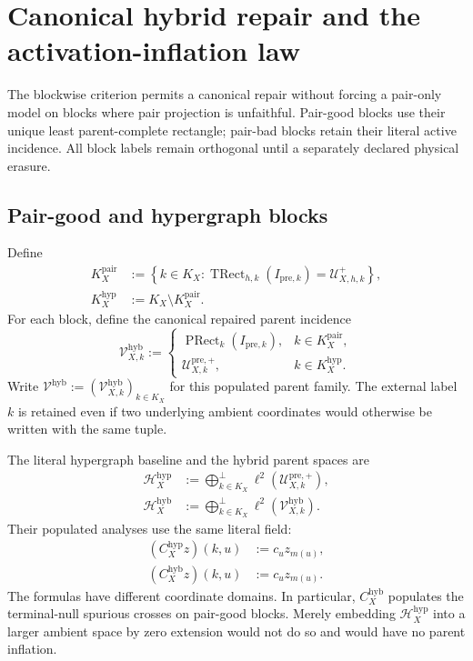 \section{Canonical hybrid repair and the activation-inflation law}
\label{sec:tpc64-hybrid-repair}

The blockwise criterion permits a canonical repair without forcing a
pair-only model on blocks where pair projection is unfaithful.  Pair-good
blocks use their unique least parent-complete rectangle; pair-bad blocks
retain their literal active incidence.  All block labels remain orthogonal
until a separately declared physical erasure.

\subsection{Pair-good and hypergraph blocks}

Define
\begin{align}
 K_X^{\mathrm{pair}}
 &:=
 \left\{k\in K_X:
 \operatorname{TRect}_{h,k}(I_{\mathrm{pre},k})
 =\mathcal U_{X,h,k}^{+}\right\},
 \label{eq:tpc64-pair-good-blocks}\\
 K_X^{\mathrm{hyp}}
 &:=
 K_X\setminus K_X^{\mathrm{pair}}.
 \label{eq:tpc64-hypergraph-blocks}
\end{align}
For each block, define the canonical repaired parent incidence
\begin{equation}
 \mathcal V_{X,k}^{\mathrm{hyb}}
 :=
 \begin{cases}
  \operatorname{PRect}_k(I_{\mathrm{pre},k}),
     &k\in K_X^{\mathrm{pair}},\\[2mm]
  \mathcal U_{X,k}^{\mathrm{pre},+},
     &k\in K_X^{\mathrm{hyp}}.
 \end{cases}
 \label{eq:tpc64-canonical-hybrid-incidence}
\end{equation}
Write
\(
 \mathcal V^{\mathrm{hyb}}
 :=(\mathcal V_{X,k}^{\mathrm{hyb}})_{k\in K_X}
\)
for this populated parent family.
The external label \(k\) is retained even if two underlying ambient
coordinates would otherwise be written with the same tuple.

The literal hypergraph baseline and the hybrid parent spaces are
\begin{align}
 \mathcal H_X^{\mathrm{hyp}}
 &:=
 \bigoplus_{k\in K_X}^{\perp}
 \ell^2(\mathcal U_{X,k}^{\mathrm{pre},+}),
 \label{eq:tpc64-hypergraph-parent-space}\\
 \mathcal H_X^{\mathrm{hyb}}
 &:=
 \bigoplus_{k\in K_X}^{\perp}
 \ell^2(\mathcal V_{X,k}^{\mathrm{hyb}}).
 \label{eq:tpc64-hybrid-parent-space}
\end{align}
Their populated analyses use the same literal field:
\begin{align}
 (C_X^{\mathrm{hyp}}z)(k,u)
 &:=c_u z_{m(u)},
 \label{eq:tpc64-hypergraph-analysis}\\
 (C_X^{\mathrm{hyb}}z)(k,u)
 &:=c_u z_{m(u)}.
 \label{eq:tpc64-hybrid-analysis}
\end{align}
The formulas have different coordinate domains.  In particular,
\(C_X^{\mathrm{hyb}}\) populates the terminal-null spurious crosses on
pair-good blocks.  Merely embedding
\(\mathcal H_X^{\mathrm{hyp}}\) into a larger ambient space by zero
extension would not do so and would have no parent inflation.

